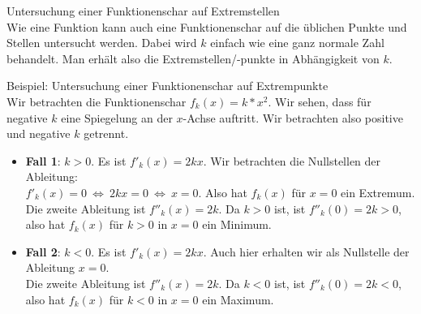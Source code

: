 \begin{bla}{Untersuchung einer Funktionenschar auf Extremstellen} \  \\
  Wie eine Funktion kann auch eine Funktionenschar auf die üblichen Punkte und Stellen untersucht werden. Dabei wird $k$ einfach wie eine ganz normale Zahl behandelt. Man erhält also die Extremstellen/-punkte in Abhängigkeit von $k$.
\end{bla}

\begin{bla}{Beispiel: Untersuchung einer Funktionenschar auf Extrempunkte} \  \\
  Wir betrachten die Funktionenschar $f_k(x)=k*x^2$. Wir sehen, dass für negative $k$ eine Spiegelung an der $x$-Achse auftritt. Wir betrachten also positive und negative $k$ getrennt.
  \begin{itemize}
    \item \textbf{Fall 1}: $k>0$. Es ist $f'_k(x)=2kx$. Wir betrachten die Nullstellen der Ableitung: \\
    $f'_k(x)=0\  \Leftrightarrow\  2kx=0\  \Leftrightarrow\  x=0$. Also hat $f_k(x)$ für $x=0$ ein Extremum. \\
    Die zweite Ableitung ist $f''_k(x)=2k$. Da $k>0$ ist, ist $f''_k(0)=2k>0$, also hat $f_k(x)$ für $k>0$ in $x=0$ ein Minimum.

    \item \textbf{Fall 2}: $k<0$. Es ist $f'_k(x)=2kx$. Auch hier erhalten wir als Nullstelle der Ableitung $x=0$. \\
    Die zweite Ableitung ist $f''_k(x)=2k$. Da $k<0$ ist, ist $f''_k(0)=2k<0$, also hat $f_k(x)$ für $k<0$ in $x=0$ ein Maximum.
  \end{itemize}

  \begin{marginfigure}[-25em]
\end{marginfigure}
\end{bla}
